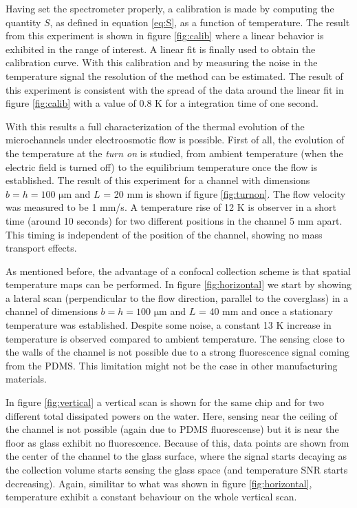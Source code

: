 \documentclass[twocolumn]{svjour3}       %
\begin{document}
Having set the spectrometer properly, a calibration is made by computing the quantity $S$, as defined in equation \ref{eq:S}, as a function of temperature. The result from this experiment is shown in figure \ref{fig:calib} where a linear behavior is exhibited in the range of interest. A linear fit is finally used to obtain the calibration curve. With this calibration and by measuring the noise in the temperature signal  the resolution of the method can be estimated. The result of this experiment is consistent with the spread of the data around the linear fit in figure \ref{fig:calib} with a value of 0.8 K for a integration time of one second.

With this results a full characterization of the thermal evolution of the microchannels under electroosmotic flow is possible. First of all, the evolution of the temperature at the \textit{turn on} is studied, from ambient temperature (when the electric field is turned off) to the equilibrium temperature once the flow is established. The result of this experiment for a channel with dimensions $b = h = 100$ $\mathrm{\mu m}$ and $L$ = 20 mm is shown if figure \ref{fig:turnon}. The flow velocity was measured to be 1 mm/s. A temperature rise of 12 K is observer in a short time (around 10 seconds) for two different positions in the channel 5 mm apart. This timing is independent of the position of the channel, showing no mass transport effects.

As mentioned before, the advantage of a confocal collection scheme is that spatial temperature maps can be performed. In figure \ref{fig:horizontal} we start by showing a lateral scan (perpendicular to the flow direction, parallel to the coverglass) in a channel of dimensions $b = h = 100$ $\mathrm{\mu m}$ and $L$ = 40 mm and once a stationary temperature was established. Despite some noise, a constant 13 K increase in temperature is observed compared to ambient temperature. The sensing close to the walls of the channel is not possible due to a strong fluorescence signal coming from the PDMS. This limitation might not be the case in other manufacturing materials.

In figure \ref{fig:vertical} a vertical scan is shown for the same chip and for two different total dissipated powers on the water. Here, sensing near the ceiling of the channel is not possible (again due to PDMS fluorescense) but it is near the floor as glass exhibit no fluorescence. Because of this, data points are shown from the center of the channel to the glass surface, where the signal starts decaying as the collection volume starts sensing the glass space (and temperature SNR starts decreasing). Again, similitar to what was shown in figure \ref{fig:horizontal}, temperature exhibit a constant behaviour on the whole vertical scan.
\end{document}

